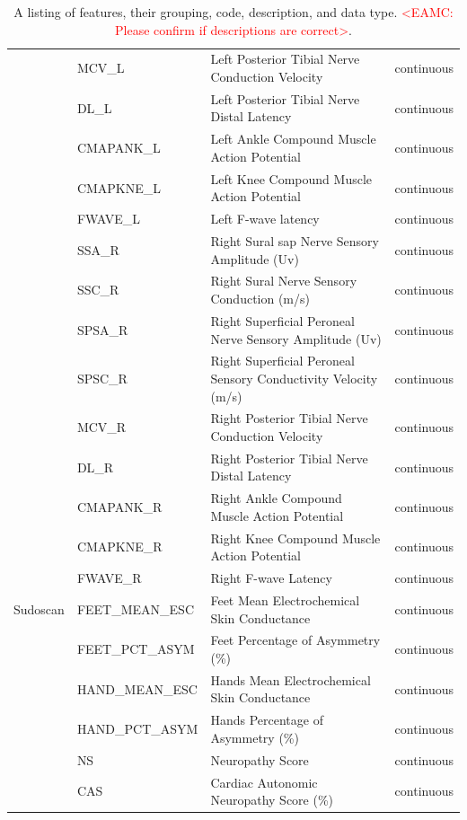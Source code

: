\documentclass[fleqn,10pt]{wlscirep}
\begin{document}
\begin{table}[h!]
\begin{tabular}{llll}
                         & MCV\_L & Left Posterior Tibial Nerve Conduction Velocity  & continuous \\
                         & DL\_L & Left Posterior Tibial Nerve Distal Latency  & continuous \\
                         & CMAPANK\_L & Left Ankle Compound Muscle Action Potential  & continuous \\
                         & CMAPKNE\_L & Left Knee Compound Muscle Action Potential  & continuous \\
                         & FWAVE\_L & Left F-wave latency  & continuous \\
                         & SSA\_R & Right Sural sap Nerve Sensory Amplitude (Uv)  & continuous \\
                         & SSC\_R & Right Sural Nerve Sensory Conduction (m/s)  & continuous \\
                         & SPSA\_R & Right Superficial Peroneal Nerve Sensory Amplitude (Uv) & continuous  \\
                         & SPSC\_R & Right Superficial Peroneal Sensory Conductivity Velocity (m/s) & continuous  \\
                         & MCV\_R & Right Posterior Tibial Nerve Conduction Velocity & continuous  \\
                         & DL\_R & Right Posterior Tibial Nerve Distal Latency & continuous  \\
                         & CMAPANK\_R & Right Ankle Compound Muscle Action Potential & continuous  \\
                         & CMAPKNE\_R & Right Knee Compound Muscle Action Potential & continuous  \\
                         & FWAVE\_R & Right F-wave Latency & continuous  \\
\midrule
Sudoscan & FEET\_MEAN\_ESC & Feet Mean Electrochemical Skin Conductance & continuous  \\
         & FEET\_PCT\_ASYM & Feet Percentage of Asymmetry (\%) & continuous  \\
         & HAND\_MEAN\_ESC & Hands Mean Electrochemical Skin Conductance & continuous  \\
         & HAND\_PCT\_ASYM & Hands Percentage of Asymmetry (\%) & continuous  \\
         & NS & Neuropathy Score & continuous  \\
         & CAS & Cardiac Autonomic Neuropathy Score (\%) & continuous  \\
\bottomrule
\end{tabular}
\caption{A listing of features, their grouping, code, description, and data type.
    \textcolor{red}{<EAMC: Please confirm if descriptions are correct>}.
}
\label{tab:features}
\end{table}
\end{document}
